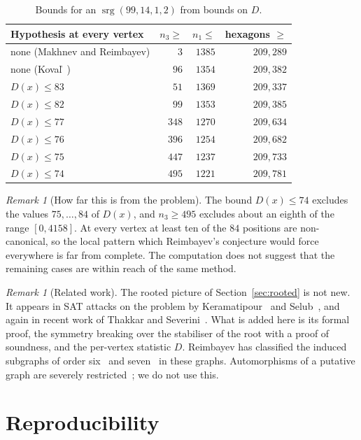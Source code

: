 \documentclass[11pt]{amsart}
\theoremstyle{remark}
\newtheorem{remark}[theorem]{Remark}
\newcommand{\srg}{\operatorname{srg}}
\begin{document}
\begin{table}[h]
\centering
\begin{tabular}{lrrr}
\toprule
Hypothesis at every vertex & $n_3\ge$ & $n_1\le$ & hexagons $\ge$\\
\midrule
none (Makhnev and Reimbayev) & $3$ & $1385$ & $209{,}289$\\
none (Kova\v{l}~\cite{Koval}) & $96$ & $1354$ & $209{,}382$\\
$D(x)\le83$ & $51$ & $1369$ & $209{,}337$\\
$D(x)\le82$ & $99$ & $1353$ & $209{,}385$\\
$D(x)\le77$ & $348$ & $1270$ & $209{,}634$\\
$D(x)\le76$ & $396$ & $1254$ & $209{,}682$\\
$D(x)\le75$ & $447$ & $1237$ & $209{,}733$\\
$D(x)\le74$ & $495$ & $1221$ & $209{,}781$\\
\bottomrule
\end{tabular}
\medskip
\caption{Bounds for an $\srg(99,14,1,2)$ from bounds on $D$.}\label{tab:ladder}
\end{table}

\begin{remark}[How far this is from the problem]
The bound $D(x)\le74$ excludes the values $75,\dots,84$ of $D(x)$, and
$n_3\ge495$ excludes about an eighth of the range $[0,4158]$. At every vertex at
least ten of the $84$ positions are non-canonical, so the local pattern
which Reimbayev's conjecture would force everywhere is far from complete. The
computation does not suggest that the remaining cases are within reach of
the same method.
\end{remark}

\begin{remark}[Related work]
The rooted picture of Section~\ref{sec:rooted} is not new. It appears in SAT
attacks on the problem by Keramatipour~\cite{Keramatipour} and
Selub~\cite{Selub}, and again in recent work of Thakkar and
Severini~\cite{ThakkarSeverini}. What is added here is its formal proof, the
symmetry breaking over the stabiliser of the root with a proof of soundness,
and the per-vertex statistic $D$. Reimbayev has classified the induced
subgraphs of order six~\cite{Reimbayev6} and seven~\cite{Reimbayev7} in these
graphs.
Automorphisms of a putative graph are severely restricted~\cite{BehbahaniLam};
we do not use this.
\end{remark}

\section{Reproducibility}\label{sec:repro}
\end{document}
